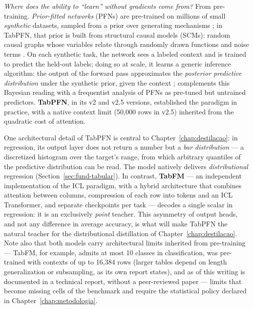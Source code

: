 \emph{Where does the ability to ``learn'' without gradients come
from?} From pre-training. \emph{Prior-fitted networks} (PFNs) are
pre-trained on millions of small \emph{synthetic} datasets, sampled
from a prior over generating mechanisms \citep{muller2022pfn}; in
TabPFN, that prior is built from structural causal models (SCMs):
random causal graphs whose variables relate through randomly drawn
functions and noise terms \citep{hollmann2025}. On each
synthetic task, the network sees a labeled context and is trained to
predict the held-out labels; doing so at scale, it learns a generic
inference algorithm: the output of the forward pass approximates the
\emph{posterior predictive distribution} under the synthetic prior,
given the context \citep{muller2022pfn}; \citet{nagler2023}
complements this Bayesian reading with a frequentist analysis of
PFNs as pre-tuned but untrained predictors. \textbf{TabPFN}, in its
v2 \citep{hollmann2025} and v2.5 \citep{priorlabs2025} versions,
established the paradigm in practice, with a native context limit
(50{,}000 rows in v2.5) inherited from the quadratic cost of
attention.

One architectural detail of TabPFN is central to
Chapter~\ref{chap:destilacao}: in regression, its output layer does
not return a number but a \emph{bar distribution} --- a discretized
histogram over the target's range, from which arbitrary quantiles of
the predictive distribution can be read. The model natively delivers
\emph{distributional} regression (Section~\ref{sec:fund-tabular}).
In contrast, \textbf{TabFM} \citep{tabfm2026,kong2026} --- an
independent implementation of the ICL paradigm, with a hybrid
architecture that combines attention between columns, compression of
each row into tokens and an ICL Transformer, and separate
checkpoints per task --- decodes a single scalar in regression: it
is an exclusively \emph{point} teacher. This asymmetry of output
heads, and not any difference in average accuracy, is what will make
TabPFN the natural teacher for the distributional distillation of
Chapter~\ref{chap:destilacao}. Note also that both models carry
architectural limits inherited from pre-training --- TabFM, for
example, admits at most 10 classes in classification, was
pre-trained with contexts of up to 16{,}384 rows (larger tables
depend on length generalization or subsampling, as its own report
states), and as of this writing is documented in a technical report,
without a peer-reviewed paper \citep{tabfm2026,kong2026} --- limits
that become missing cells of the benchmark and require the
statistical policy declared in Chapter~\ref{chap:metodologia}.

